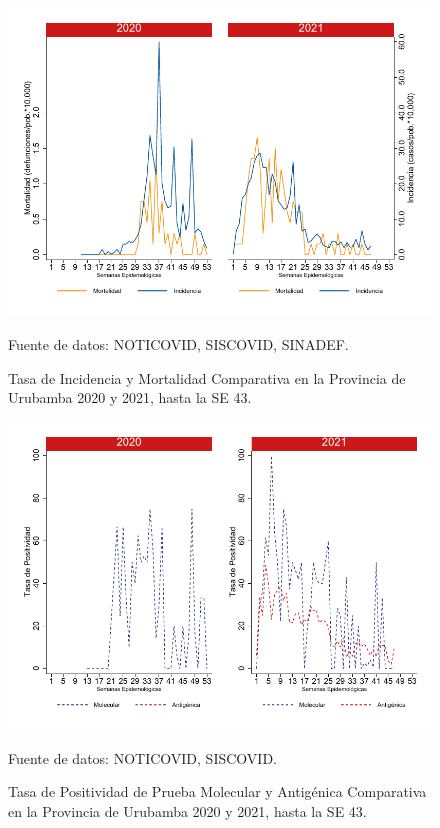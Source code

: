 \documentclass[12pt,a4paper,openany]{book}
\begin{document}
		\begin{figure}[h]
			\caption{Tasa de Incidencia y Mortalidad Comparativa en la Provincia de Urubamba 2020 y 2021, hasta la SE 43.}\label{fig:inc_urub}
			\begin{center}
				\includegraphics[width=0.7\linewidth]{../figuras/incidencia_mortalidad_20_21_13}
			\end{center}
			{\footnotesize {Fuente de datos: NOTICOVID, SISCOVID, SINADEF.}}
		\end{figure}
		
		\begin{figure}[h]
			\caption{Tasa de Positividad de Prueba Molecular y Antigénica Comparativa en la Provincia de Urubamba 2020 y 2021, hasta la SE 43.}\label{fig:positividad_urub}
			\begin{center}
				\includegraphics[width=0.7\linewidth]{../figuras/positividad_20_21_13}
			\end{center}
			{\footnotesize {Fuente de datos: NOTICOVID, SISCOVID.}}
		\end{figure}
		
\end{document}
